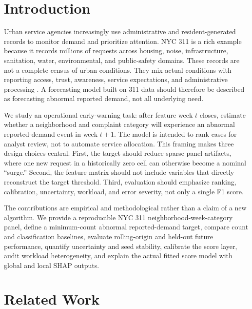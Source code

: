 \documentclass[pdflatex,sn-mathphys-num]{sn-jnl}
\begin{document}
\ifdefined\SIMCsubmission
  \pagestyle{empty}
  \thispagestyle{empty}
\fi

\section{Introduction}\label{sec:introduction}

Urban service agencies increasingly use administrative and resident-generated records to monitor demand and prioritize attention. NYC 311 is a rich example because it records millions of requests across housing, noise, infrastructure, sanitation, water, environmental, and public-safety domains. These records are not a complete census of urban conditions. They mix actual conditions with reporting access, trust, awareness, service expectations, and administrative processing \cite{Wang2017Structure311,KontokostaHong2021Bias}. A forecasting model built on 311 data should therefore be described as forecasting abnormal reported demand, not all underlying need.

We study an operational early-warning task: after feature week \(t\) closes, estimate whether a neighborhood and complaint category will experience an abnormal reported-demand event in week \(t+1\). The model is intended to rank cases for analyst review, not to automate service allocation. This framing makes three design choices central. First, the target should reduce sparse-panel artifacts, where one new request in a historically zero cell can otherwise become a nominal ``surge.'' Second, the feature matrix should not include variables that directly reconstruct the target threshold. Third, evaluation should emphasize ranking, calibration, uncertainty, workload, and error severity, not only a single F1 score.

The contributions are empirical and methodological rather than a claim of a new algorithm. We provide a reproducible NYC 311 neighborhood-week-category panel, define a minimum-count abnormal reported-demand target, compare count and classification baselines, evaluate rolling-origin and held-out future performance, quantify uncertainty and seed stability, calibrate the score layer, audit workload heterogeneity, and explain the actual fitted score model with global and local SHAP outputs.

\section{Related Work}\label{sec:related}
\end{document}
